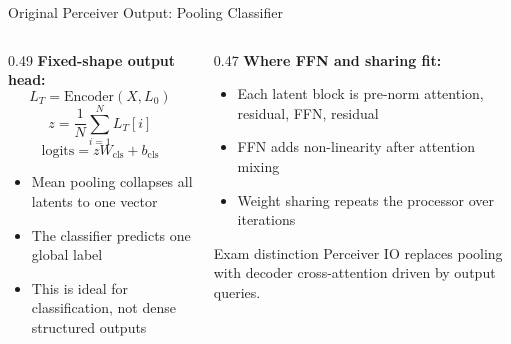\documentclass[aspectratio=169,11pt]{beamer}
\begin{document}
\begin{frame}[shrink=5]{Original Perceiver Output: Pooling Classifier}
  \begin{columns}[T]
    \begin{column}{0.49\textwidth}
      \textbf{Fixed-shape output head:}
      \[
        L_T=\mathrm{Encoder}(X,L_0)
      \]
      \[
        z=\frac{1}{N}\sum_{i=1}^{N}L_T[i]
      \]
      \[
        \mathrm{logits}=zW_{\mathrm{cls}}+b_{\mathrm{cls}}
      \]

      \vspace{0.4em}
      \begin{itemize}
        \item Mean pooling collapses all latents to one vector
        \item The classifier predicts one global label
        \item This is ideal for classification, not dense structured outputs
      \end{itemize}
    \end{column}
    \begin{column}{0.47\textwidth}
      \small
      \textbf{Where FFN and sharing fit:}
      \begin{itemize}
        \item Each latent block is pre-norm attention, residual, FFN, residual
        \item FFN adds non-linearity after attention mixing
        \item Weight sharing repeats the processor over iterations
      \end{itemize}

      \vspace{0.35em}
      \begin{alertblock}{Exam distinction}
        Perceiver IO replaces pooling with decoder cross-attention driven by output queries.
      \end{alertblock}
    \end{column}
  \end{columns}
\end{frame}
\end{document}
